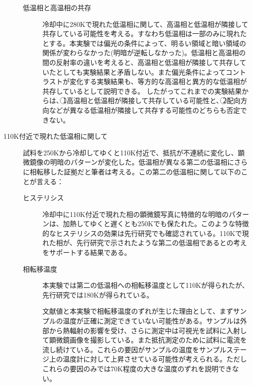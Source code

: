 \documentclass[11pt,a4paper]{jsarticle}
\begin{document}
\begin{description}
\begin{description}
\item[低温相と高温相の共存]
冷却中に280Kで現れた低温相に関して、高温相と低温相が隣接して共存している可能性を考える。すなわち低温相は一部のみに現れたとする。本実験では偏光の条件によって、明るい領域と暗い領域の関係が変わらなかった(明暗が逆転しなかった)。低温相と高温相の間の反射率の違いを考えると、高温相と低温相が隣接して共存していたとしても実験結果と矛盾しない。また偏光条件によってコントラストが変化する実験結果も、等方的な高温相と異方的な低温相が共存しているとして説明できる。
したがってこれまでの実験結果からは、\textcircled{\scriptsize 1}高温相と低温相が隣接して共存している可能性と、\textcircled{\scriptsize 2}配向方向などが異なる低温相が隣接して共存する可能性のどちらも否定できない。

\end{description}

\item[110K付近で現れた低温相に関して]
\item[]
試料を250Kから冷却してゆくと110K付近で、抵抗が不連続に変化し、顕微鏡像の明暗のパターンが変化した。低温相が異なる第二の低温相にさらに相転移した証拠だと筆者は考える。この第二の低温相に関して以下のことが言える：

\begin{description}
\item[ヒステリシス]
冷却中に110K付近で現れた相の顕微鏡写真に特徴的な明暗のパターンは、加熱してゆくと遅くとも250Kでも保たれた。このような特徴的なヒステリシスの効果は先行研究\cite{IrTe_TT3,IrTe_TT4}でも確認されている。110Kで現れた相が、先行研究で示されたような第二の低温相であるとの考えをサポートする結果である。
 
 \item[相転移温度]
 本実験では第二の低温相への相転移温度として110Kが得られたが、先行研究では180K\cite{IrTe_TT1,IrTe_TT2,IrTe_TT3,IrTe_TT4}が得られている。
 
文献値と本実験で相転移温度のずれが生じた理由として、まずサンプルの温度が正確に測定できていない可能性がある。サンプルは外部から熱輻射の影響を受け、さらに測定中は可視光を試料に入射して顕微鏡画像を撮影している。また抵抗測定のために試料に電流を流し続けている。これらの要因がサンプルの温度をサンプルステージ上の温度計に対して上昇させている可能性が考えられる。ただしこれらの要因のみでは70K程度の大きな温度のずれを説明できない。
 

\end{description}
\end{description}
\end{document}
